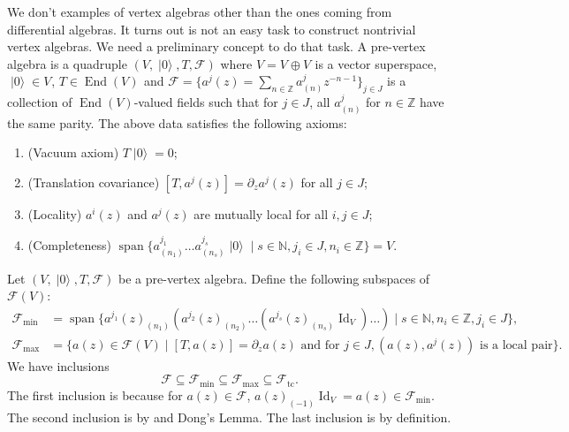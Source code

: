 \documentclass[a4paper, 12pt, reqno]{amsart}
\theoremstyle{remark}
\numberwithin{equation}{subsection}
\DeclareMathOperator{\Id}{Id}
\DeclareMathOperator{\End}{End}
\DeclareMathOperator{\vspan}{span}
\DeclareMathOperator{\vac}{|0\rangle}
\DeclareMathOperator{\zero}{\overline{0}}
\DeclareMathOperator{\one}{\overline{1}}
\DeclareMathOperator{\tc}{tc}
\begin{document}
We don't examples of vertex algebras other than the ones coming from differential algebras.
It turns out is not an easy task to construct nontrivial vertex algebras.
We need a preliminary concept to do that task. 
A pre-vertex algebra is a quadruple $(V, \vac, T, \mathcal{F})$ where $V = V_{\zero} \oplus V_{\one}$ is a vector superspace, $\vac \in V_{\zero}$, $T \in \End(V)_{\zero}$ and $\mathcal{F} = \{a^j(z) = \sum_{n \in \mathbb{Z}}a^j_{(n)}z^{-n - 1}\}_{j \in J}$ is a collection of $\End(V)$-valued fields such that for $j \in J$, all $a^j_{(n)}$ for $n \in \mathbb{Z}$ have the same parity.
The above data satisfies the following axioms:
\begin{enumerate}
\item (Vacuum axiom) $T\vac = 0$;
\item (Translation covariance) $[T, a^j(z)] = \partial_za^j(z)$ for all $j \in J$;
\item (Locality) $a^i(z)$ and $a^j(z)$ are mutually local for all $i, j \in J$;
\item (Completeness) $\vspan\{a^{j_1}_{(n_1)}\dots a^{j_s}_{(n_s)}\vac \mid s \in \mathbb{N}, j_i \in J, n_i \in \mathbb{Z}\} = V$.
\end{enumerate}

Let $(V, \vac, T, \mathcal{F})$ be a pre-vertex algebra.
Define the following subspaces of $\mathcal{F}(V)$:
\begin{align*}
  \mathcal{F}_{\min} &= \vspan\{a^{j_1}(z)_{(n_1)}(a^{j_2}(z)_{(n_2)}\dots(a^{j_s}(z)_{(n_s)}\Id_V)\dots) \mid s \in \mathbb{N}, n_i \in \mathbb{Z}, j_i \in J\}, \\
  \mathcal{F}_{\max} &= \{a(z) \in \mathcal{F}(V) \mid [T, a(z)] = \partial_za(z)\text{ and for }j \in J, (a(z),a^j(z))\text{ is a local pair}\}.
\end{align*}
We have inclusions
\begin{equation*}
  \mathcal{F} \subseteq \mathcal{F}_{\min} \subseteq \mathcal{F}_{\max} \subseteq \mathcal{F}_{\tc}.
\end{equation*}
The first inclusion is because for $a(z) \in \mathcal{F}$, $a(z)_{(-1)}\Id_V = a(z) \in \mathcal{F}_{\min}$.
The second inclusion is by  and Dong's Lemma.
The last inclusion is by definition.
\end{document}
